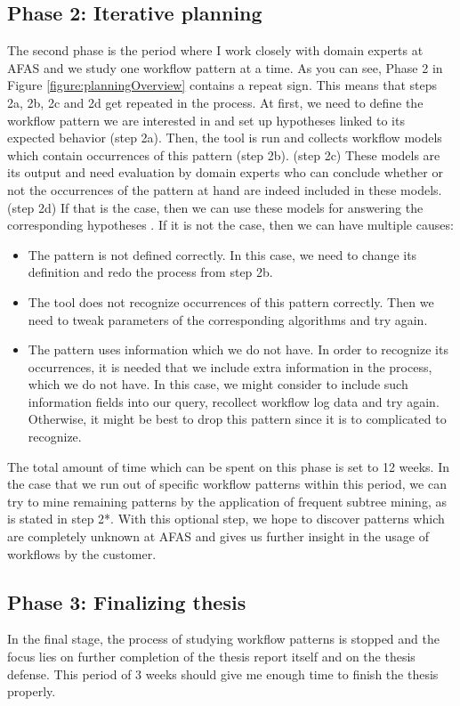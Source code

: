 \documentclass[a4paper,11pt]{article}
\begin{document}
\subsection{Phase 2: Iterative planning}
The second phase is the period where I work closely with domain experts at AFAS and we study one workflow pattern at a time. As you can see, Phase 2 in Figure \ref{figure:planningOverview} contains a repeat sign. This means that steps 2a, 2b, 2c and 2d get repeated in the process. At first, we need to define the workflow pattern we are interested in and set up hypotheses linked to its expected behavior (step 2a). Then, the tool is run and collects workflow models which contain occurrences of this pattern (step 2b). (step 2c) These models are its output and need evaluation by domain experts who can conclude whether or not the occurrences of the pattern at hand are indeed included in these models. (step 2d) If that is the case, then we can use these models for answering the corresponding hypotheses . If it is not the case, then we can have multiple causes:
\begin{itemize}
\item The pattern is not defined correctly. In this case, we need to change its definition and redo the process from step 2b.
\item The tool does not recognize occurrences of this pattern correctly. Then we need to tweak parameters of the corresponding algorithms and try again.
\item The pattern uses information which we do not have. In order to recognize its occurrences, it is needed that we include extra information in the process, which we do not have. In this case, we might consider to include such information fields into our query, recollect workflow log data and try again. Otherwise, it might be best to drop this pattern since it is to complicated to recognize.
\end{itemize}

The total amount of time which can be spent on this phase is set to 12 weeks. In the case that we run out of specific workflow patterns within this period, we can try to mine remaining patterns by the application of frequent subtree mining, as is stated in step 2*. With this optional step, we hope to discover patterns which are completely unknown at AFAS and gives us further insight in the usage of workflows by the customer.

\subsection{Phase 3: Finalizing thesis}
In the final stage, the process of studying workflow patterns is stopped and the focus lies on further completion of the thesis report itself and on the thesis defense. This period of 3 weeks should give me enough time to finish the thesis properly.
\end{document}
